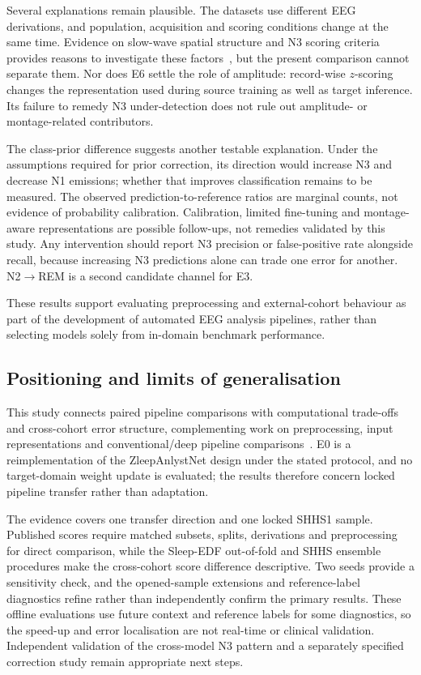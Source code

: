 \documentclass[11pt,a4paper]{article}
\begin{document}
Several explanations remain plausible. The datasets use different EEG derivations, and population,
acquisition and scoring conditions change at the same time. Evidence on slow-wave spatial structure
and N3 scoring criteria provides reasons to investigate these factors~\cite{massimini2004travelling,davidson2025n3},
but the present comparison cannot separate them. Nor does E6 settle the role of amplitude:
record-wise $z$-scoring changes the representation used during source training as well as target
inference. Its failure to remedy N3 under-detection does not rule out amplitude- or montage-related
contributors.

The class-prior difference suggests another testable explanation. Under the assumptions required for
prior correction, its direction would increase N3 and decrease N1 emissions; whether that improves
classification remains to be measured. The observed prediction-to-reference ratios are marginal
counts, not evidence of probability calibration. Calibration, limited fine-tuning and montage-aware
representations are possible follow-ups, not remedies validated by this study. Any intervention should
report N3 precision or false-positive rate alongside recall, because increasing N3 predictions alone
can trade one error for another. N2$\rightarrow$REM is a second candidate channel for E3.

These results support evaluating preprocessing and external-cohort behaviour as part of the development
of automated EEG analysis pipelines, rather than selecting models solely from in-domain benchmark
performance.

\subsection{Positioning and limits of generalisation}

This study connects paired pipeline comparisons with computational trade-offs and cross-cohort error
structure, complementing work on preprocessing, input representations and conventional/deep pipeline
comparisons~\cite{haghayegh2023sleepinceptionnet,vdd2023traditional}. E0 is a reimplementation of the
ZleepAnlystNet design under the stated protocol, and no target-domain weight update is evaluated; the
results therefore concern locked pipeline transfer rather than adaptation.

The evidence covers one transfer direction and one locked SHHS1 sample. Published scores require matched
subsets, splits, derivations and preprocessing for direct comparison, while the Sleep-EDF out-of-fold and
SHHS ensemble procedures make the cross-cohort score difference descriptive. Two seeds provide a
sensitivity check, and the opened-sample extensions and reference-label diagnostics refine rather than
independently confirm the primary results. These offline evaluations use future context and reference
labels for some diagnostics, so the speed-up and error localisation are not real-time or clinical
validation. Independent validation of the cross-model N3 pattern and a separately specified correction
study remain appropriate next steps.
\end{document}
